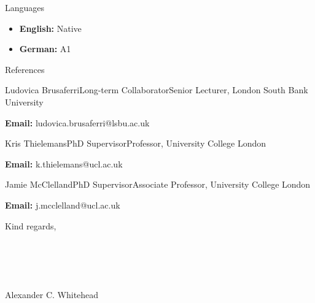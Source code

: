 \documentclass{cv}
\begin{document}
    \begin{rSection}{Languages}
        \item \begin{itemize}
            \item \textbf{English:} Native
            \item \textbf{German:} A1
        \end{itemize} 
    \end{rSection}

    \begin{rSection}{References}
        \item \begin{rSubsection}{Ludovica Brusaferri}{Long-term Collaborator}{Senior Lecturer, London South Bank University}{}
            \item \textbf{Email:} ludovica.brusaferri@lsbu.ac.uk
        \end{rSubsection}
        
        \item \begin{rSubsection}{Kris Thielemans}{PhD Supervisor}{Professor, University College London}{}
            \item \textbf{Email:} k.thielemans@ucl.ac.uk
        \end{rSubsection}

        \item \begin{rSubsection}{Jamie McClelland}{PhD Supervisor}{Associate Professor, University College London}{}
            \item \textbf{Email:} j.mcclelland@ucl.ac.uk
        \end{rSubsection}
    \end{rSection}
    
    \begin{rSection}{}
        \item Kind regards,
        \\
        \\
        \\
        \\
        \\
        \item Alexander C. Whitehead
    \end{rSection}

    \newpage
\end{document}
